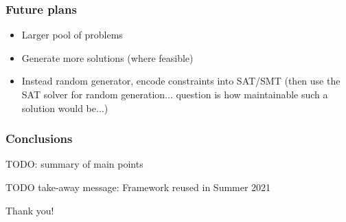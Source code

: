 \documentclass[xcolor={table}]{beamer}
\begin{document}


\begin{frame}
\frametitle{Future plans}
\begin{itemize}
    \item Larger pool of problems
    \item Generate more solutions (where feasible)
    \item Instead random generator, encode constraints into SAT/SMT
            (then use the SAT solver for random generation... question is how maintainable such a solution would be...)
\end{itemize}
\end{frame}



\begin{frame}
\frametitle{Conclusions}
TODO: summary of main points

TODO take-away message: Framework reused in Summer 2021

\bigskip
\pause

\begin{center}
    Thank you!
\end{center}
\end{frame}

\end{document}
